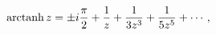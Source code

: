 \[\mathop{\mathrm{arctanh}\/}\nolimits z=\pm i\frac{\pi}{2}+\frac{1}{z}+\frac{1}%
{3z^{3}}+\frac{1}{5z^{5}}+\cdots,\]